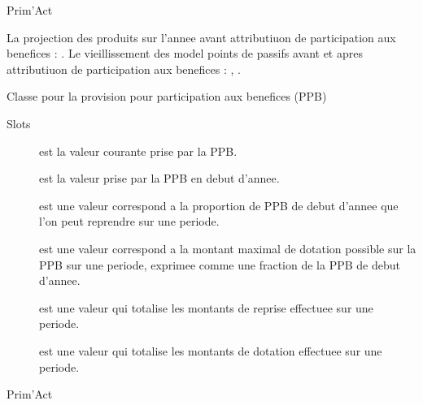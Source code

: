 \documentclass[a4paper]{book}
\begin{document}
%
\begin{Author}\relax
Prim'Act
\end{Author}
%
\begin{SeeAlso}\relax
La projection des produits sur l'annee avant attributiuon de participation
aux benefices : .
Le vieillissement des model points de passifs avant et apres attributiuon de participation
aux benefices : , .
\end{SeeAlso}
%
\begin{Description}\relax
Classe pour la provision pour participation aux benefices (PPB)
\end{Description}
%
\begin{Section}{Slots}

\begin{description}

\item[] est la valeur courante  prise par la PPB.

\item[] est la valeur prise  par la PPB en debut d'annee.

\item[] est une valeur  correspond a la proportion de PPB de debut d'annee
que l'on peut reprendre sur une periode.

\item[] est une valeur  correspond a la montant maximal de dotation possible sur la PPB
sur une periode, exprimee comme une fraction de la PPB de debut d'annee.

\item[] est une valeur  qui totalise les montants de reprise effectuee sur une periode.

\item[] est une valeur  qui totalise les montants de dotation effectuee sur une periode.

\end{description}
\end{Section}
%
\begin{Author}\relax
Prim'Act
\end{Author}
\end{document}
